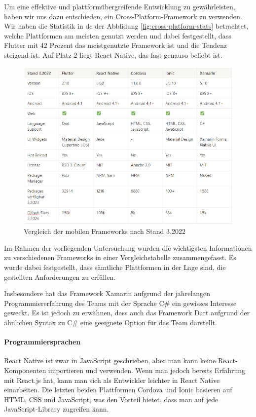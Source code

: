 Um eine effektive und plattformübergreifende Entwicklung zu gewährleisten, haben wir uns dazu entschieden, ein Cross-Platform-Framework zu verwenden. Wir haben die Statistik in de der Abblidung \ref{fig:cross-platform-stats} betrachtet, welche Plattformen am meisten genutzt werden und dabei festgestellt, dass Flutter mit 42 Prozent das meistgenutzte Framework ist und die Tendenz steigend ist. Auf Platz 2 liegt React Native, das fast genauso beliebt ist.

\begin{figure}[h]
    \centering
    \includegraphics[width=1\textwidth]{pics/framework-comp.png}
    \caption{Vergleich der mobilen Frameworks nach Stand 3.2022 \cite{flutter, react-native, cordova, ionic, xamarin}}
    \label{fig:framework-comp}
\end{figure}

Im Rahmen der vorliegenden Untersuchung wurden die wichtigsten Informationen zu verschiedenen Frameworks in einer Vergleichstabelle zusammengefasst. Es wurde dabei festgestellt, dass sämtliche Plattformen in der Lage sind, die gestellten Anforderungen zu erfüllen.

Insbesondere hat das Framework Xamarin aufgrund der jahrelangen Programmiererfahrung des Teams mit der Sprache C\# ein gewisses Interesse geweckt. Es ist jedoch zu erwähnen, dass auch das Framework Dart aufgrund der ähnlichen Syntax zu C\# eine geeignete Option für das Team darstellt.

\paragraph{Programmiersprachen}
\newline
React Native ist zwar in JavaScript geschrieben, aber man kann keine React-Komponenten importieren und verwenden. Wenn man jedoch bereits Erfahrung mit React.js hat, kann man sich als Entwickler leichter in React Native einarbeiten. Die letzten beiden Plattformen Cordova und Ionic basieren auf HTML, CSS und JavaScript, was den Vorteil bietet, dass man auf jede JavaScript-Library zugreifen kann.


